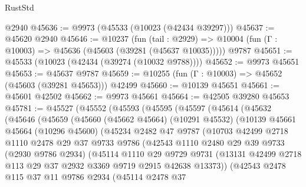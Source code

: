 \begin{lexlean}{RustStd}
\begin{coremodule}
    @2940
@45636 := @9973 (@45533 (@10023 (@42434 @39297)))
@45637 := @45620 @2940
@45646 := @10237
    (fun (tail : @2929) => @10004 (fun (Γ : @10003) => @45636 (@45603 (@39281 (@45637 @10035)))))
    @9787
@45651 := @45533 (@10023 (@42434 (@39274 (@10032 @9788))))
@45652 := @9973 @45651
@45653 := @45637 @9787
@45659 := @10255 (fun (Γ : @10003) => @45652 (@45603 (@39281 @45653))) @42499
@45660 := @10139 @45651
@45661 := @45601 @42502
@45662 := @9973 @45661
@45664 := @42505 @39280 @45653
@45781 := @45527
    (@45552
      (@45593
        (@45595
          (@45597
            (@45614
              (@45632
                (@45646
                  (@45659
                    (@45660
                      (@45662 @45664)
                      (@10291 @45532)
                      (@10139
                        @45661
                        @45664
                        (@10296 @45600)
                        (@45234
                          @2482
                          @47
                          @9787
                          (@10703
                            @42499
                            @2718
                            @1110
                            @2478
                            @29
                            @37
                            @9733
                            @9786
                            (@42543
                              @1110
                              @2480
                              @29
                              @39
                              @9733
                              (@2930 @9786 @2934)
                              (@45114
                                @1110
                                @29
                                @9729
                                @9731
                                (@13131
                                  @42499
                                  @2718
                                  @113
                                  @29
                                  @37
                                  @2932
                                  @3369
                                  @9719
                                  @2915
                                  @42638
                                  @13373))
                              (@42543
                                @2478
                                @115
                                @37
                                @11
                                @9786
                                @2934
                                (@45114
                                  @2478
                                  @37

\end{coremodule}
\end{lexlean}
